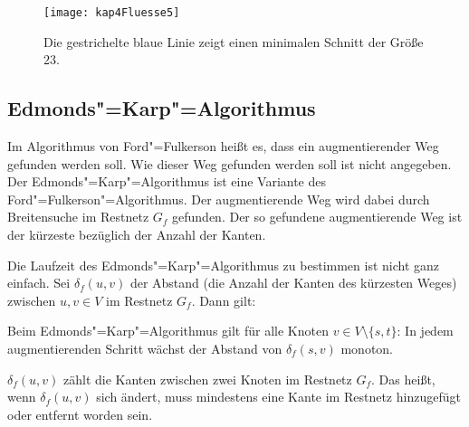 \begin{figure}[htb]
  \centering
  \texttt{[image: kap4Fluesse5]}
  \caption{Die gestrichelte blaue Linie zeigt einen minimalen Schnitt der Größe $23$.}
  \label{kap4Fluesse5}
\end{figure}

\subsection{Edmonds"=Karp"=Algorithmus}
Im Algorithmus von Ford"=Fulkerson heißt es, dass ein augmentierender Weg gefunden werden soll. Wie dieser Weg gefunden werden soll ist nicht angegeben. Der Edmonds"=Karp"=Algorithmus ist eine Variante des Ford"=Fulkerson"=Algorithmus. Der augmentierende Weg wird dabei durch Breitensuche im Restnetz $G_f$ gefunden. Der so gefundene augmentierende Weg ist der kürzeste bezüglich der Anzahl der Kanten.

Die Laufzeit des Edmonds"=Karp"=Algorithmus zu bestimmen ist nicht ganz einfach. Sei $\delta_f(u,v)$ der Abstand (die Anzahl der Kanten des kürzesten Weges) zwischen $u,v \in V$ im Restnetz $G_f$. Dann gilt:
\begin{Lma}
  \hspace{\parindent}Beim Edmonds"=Karp"=Algorithmus gilt für alle Knoten $v \in V \setminus \{ s,t \}$: In jedem augmentierenden Schritt wächst der Abstand von $\delta_{f}(s,v)$ monoton.
\end{Lma}

\begin{Bem}
  \hspace{\parindent}$\delta_{f}(u,v)$ zählt die Kanten zwischen zwei Knoten im Restnetz $G_f$. Das heißt, wenn $\delta_{f}(u,v)$ sich ändert, muss mindestens eine Kante im Restnetz hinzugefügt oder entfernt worden sein. %
\end{Bem}

